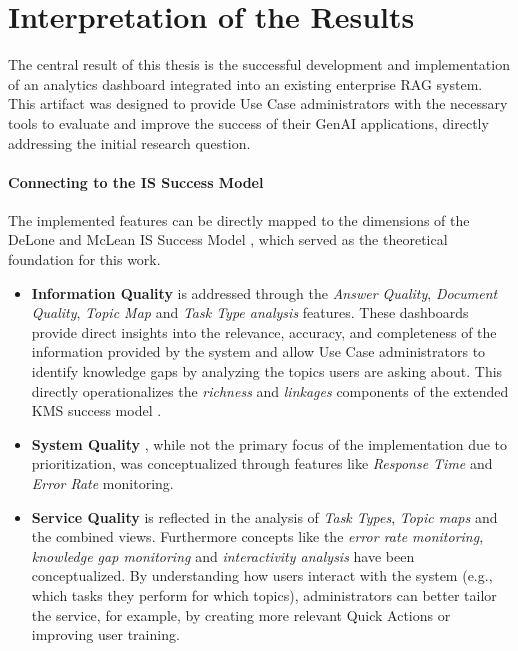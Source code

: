 \documentclass[
	english,
	ruledheaders=section,%
	class=report,%
	thesis={type=bachelor},%
	accentcolor=1b,%
	custommargins=true,%
	marginpar=false,%
	parskip=half-,%
	fontsize=11pt,%
	DIV=14,
]{tudapub}
\begin{document}
\section{Interpretation of the Results}
The central result of this thesis is the successful development and implementation of an analytics dashboard integrated into an existing enterprise RAG system. This artifact was designed to provide Use Case administrators with the necessary tools to evaluate and improve the success of their GenAI applications, directly addressing the initial research question.

\paragraph{Connecting to the IS Success Model} The implemented features can be directly mapped to the dimensions of the DeLone and McLean IS Success Model \parencite{DeloneMcLean2003ISSuccessTenYearUpdate}, which served as the theoretical foundation for this work.
\begin{itemize}
    \item \textbf{Information Quality} is addressed through the \textit{Answer Quality}, \textit{Document Quality}, \textit{Topic Map} and \textit{Task Type analysis} features. These dashboards provide direct insights into the relevance, accuracy, and completeness of the information provided by the system and allow Use Case administrators to identify knowledge gaps by analyzing the topics users are asking about. This directly operationalizes the \textit{richness} and \textit{linkages} components of the extended KMS success model \parencite[pp.~57--58]{Jennex2006}.
    \item \textbf{System Quality} \parencite[p.~64]{DeloneMcLean1992ISSuccess}, while not the primary focus of the implementation due to prioritization, was conceptualized through features like \textit{Response Time} and \textit{Error Rate} monitoring.
    \item \textbf{Service Quality} is reflected in the analysis of \textit{Task Types}, \textit{Topic maps} and the combined views. Furthermore concepts like the \textit{error rate monitoring}, \textit{knowledge gap monitoring} and \textit{interactivity analysis} have been conceptualized. By understanding how users interact with the system (e.g., which tasks they perform for which topics), administrators can better tailor the service, for example, by creating more relevant Quick Actions or improving user training.
\end{itemize}
\end{document}
